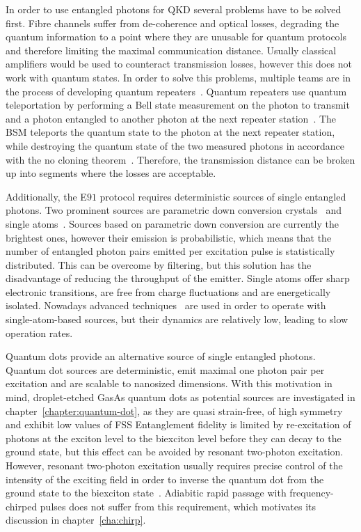 In order to use entangled photons for \ac{QKD} several problems have to be solved first.
Fibre channels suffer from de-coherence and optical losses, degrading the quantum information to a point where they are unusable for quantum protocols and therefore limiting the maximal communication distance.
Usually classical amplifiers would be used to counteract transmission losses, however this does not work with quantum states.
In order to solve this problems, multiple teams are in the process of developing quantum repeaters~\cite{reindl_all-photonic_2018}\cite{duan_long-distance_2001}\cite{simon_quantum_2007}.
Quantum repeaters use quantum teleportation by performing a Bell state measurement on the photon to transmit and a photon entangled to another photon at the next repeater station~\cite{bennett_teleporting_1993}.
The \ac{BSM} teleports the quantum state to the photon at the next repeater station, while destroying the quantum state of the two measured photons in accordance with the no cloning theorem~\cite{park_concept_1970}.
Therefore, the transmission distance can be broken up into segments where the losses are acceptable.

Additionally, the E$91$ protocol requires deterministic sources of single entangled photons.
Two prominent sources are parametric down conversion crystals~\cite{shih_new_1988} and single atoms~\cite{aspect_experimental_1981}.
Sources based on parametric down conversion are currently the brightest ones, however their emission is probabilistic, which means that the number of entangled photon pairs emitted per excitation pulse is statistically distributed.
This can be overcome by filtering, but this solution has the disadvantage of reducing the throughput of the emitter.
Single atoms offer sharp electronic transitions, are free from charge fluctuations and are energetically isolated.
Nowadays advanced techniques~\cite{kuhn_deterministic_2002} are used in order to operate with single-atom-based sources, but their dynamics are relatively low, leading to slow operation rates.

Quantum dots provide an alternative source of single entangled photons.
Quantum dot sources are deterministic, emit maximal one photon pair per excitation and are scalable to nanosized dimensions.
With this motivation in mind, droplet-etched GasAs quantum dots as potential sources are investigated in chapter~\ref{chapter:quantum-dot}, as they are quasi strain-free, of high symmetry and exhibit low values of \ac{FSS}
Entanglement fidelity is limited by re-excitation of photons at the exciton level to the biexciton level before they can decay to the ground state, but this effect can be avoided by resonant two-photon excitation.
However, resonant two-photon excitation usually requires precise control of the intensity of the exciting field in order to inverse the quantum dot from the ground state to the biexciton state~\cite{jayakumar_deterministic_2013}.
Adiabitic rapid passage with frequency-chirped pulses does not suffer from this requirement, which motivates its discussion in chapter~\ref{cha:chirp}.

